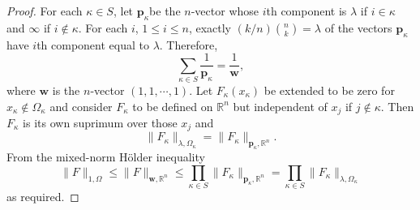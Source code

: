 \begin{proof}
  For each $\kappa \in S$, let $\mathbf{p}_\kappa$be the $n$-vector whose $i$th component is $\lambda$ if $i\in \kappa$ and $\infty$ if $i\not\in \kappa$. For each $i$, $1\le i\le n$, exactly $\left( k\slash n \right) \binom{n}{k}=\lambda$ of the vectors $\mathbf{p}_{\kappa}$ have $i$th component equal to $\lambda$. Therefore, 
  \[
    \sum_{\kappa \in S}\frac{1}{\mathbf{p}_{\kappa}}=\frac{1}{\mathbf{w}},
  \] 
  where $\mathbf{w}$ is the $n$-vector $(1,1,\cdots,1)$.
  Let $F_{\kappa}(x_{\kappa})$ be extended to be zero for $x_{\kappa}\not\in \Omega_{\kappa}$ and consider $F_{\kappa}$ to be defined on $\mathbb{R}^{n}$ but independent of $x_{j}$ if $j\not \in \kappa$. Then $F_{\kappa}$ is its own suprimum over those $x_{j}$ and 
   \[
     \|F_{\kappa}\|_{\lambda,\Omega_\kappa}=\|F_{\kappa}\|_{\mathbf{p}_\kappa,\mathbb{R}^{n}}.
  \] 
  From the mixed-norm H\"{o}lder inequality
  \[
    \|F\|_{1,\Omega}\le \|F\|_{\mathbf{w},\mathbb{R}^{n}}\le \prod_{\kappa\in S}\|F_{\kappa}\|_{\mathbf{p}_\kappa,\mathbb{R}^{n}}=\prod_{\kappa \in S}\|F_{\kappa}\|_{\lambda,\Omega_\kappa}
  \] 
  as required.
\end{proof}

